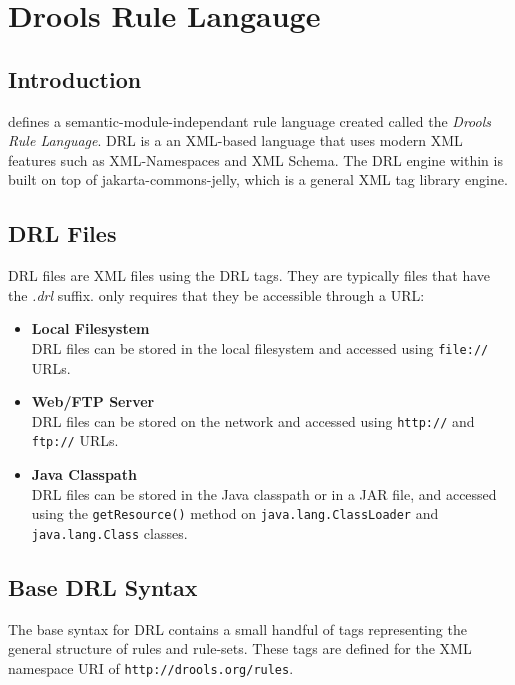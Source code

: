 \chapter{Drools Rule Langauge}

\section{Introduction}

\drools{} defines a semantic-module-independant rule language created 
called the \emph{Drools Rule Language}.  DRL is a an XML-based
language that uses modern XML features such as XML-Namespaces and XML
Schema. The DRL engine within \drools{} is built on top of
jakarta-commons-jelly, which is a general XML tag library
engine. 

\section{DRL Files}

DRL files are XML files using the DRL tags. They are typically files
that have the \emph{.drl} suffix.  \drools{} only requires that they
be accessible through a URL:

\begin{itemize}
	\item \textbf{\textsf{Local Filesystem}} \\
		DRL files can be stored in the local filesystem and
		accessed using \verb|file://| URLs.
	\item \textbf{\textsf{Web/FTP Server}} \\
		DRL files can be stored on the network and
		accessed using \verb|http://| and \verb|ftp://| URLs.
	\item \textbf{\textsf{Java Classpath}} \\
		DRL files can be stored in the Java classpath or in a JAR
		file, and accessed using the \verb|getResource()| method
		on \verb|java.lang.ClassLoader| and \verb|java.lang.Class|
		classes.
\end{itemize}

\clearpage

\section{Base DRL Syntax}

The base syntax for DRL contains a small handful of tags 
representing the general structure of rules and rule-sets.
These tags are defined for the XML namespace URI of
\verb|http://drools.org/rules|.

